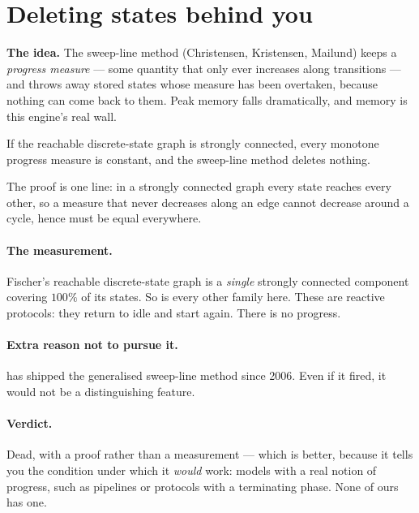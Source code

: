 \section{Deleting states behind you \hfill \dead{}}

\textbf{The idea.} The sweep-line method (Christensen, Kristensen, Mailund) keeps a
\emph{progress measure} --- some quantity that only ever increases along transitions --- and
throws away stored states whose measure has been overtaken, because nothing can come back to them.
Peak memory falls dramatically, and memory is this engine's real wall.

\begin{theorem}
If the reachable discrete-state graph is strongly connected, every monotone progress measure is
constant, and the sweep-line method deletes nothing.
\end{theorem}

The proof is one line: in a strongly connected graph every state reaches every other, so a measure
that never decreases along an edge cannot decrease around a cycle, hence must be equal everywhere.

\paragraph{The measurement.} Fischer's reachable discrete-state graph is a \emph{single} strongly
connected component covering $100\%$ of its states. So is every other family here. These are
reactive protocols: they return to idle and start again. There is no progress.

\paragraph{Extra reason not to pursue it.} \uppaal{} has shipped the generalised sweep-line method
since 2006. Even if it fired, it would not be a distinguishing feature.

\paragraph{Verdict.} Dead, with a proof rather than a measurement --- which is better, because it
tells you the condition under which it \emph{would} work: models with a real notion of progress,
such as pipelines or protocols with a terminating phase. None of ours has one.
